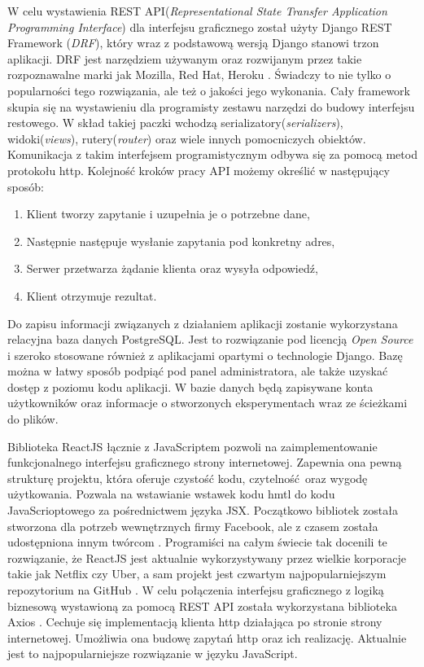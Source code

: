 W celu wystawienia REST API(\textit{Representational State Transfer Application Programming Interface}) dla interfejsu graficznego został użyty Django REST Framework (\textit{DRF}), który wraz z podstawową wersją Django stanowi trzon aplikacji. DRF jest narzędziem używanym oraz rozwijanym przez takie rozpoznawalne marki jak  Mozilla, Red Hat, Heroku \cite{misc_django_rest}. Świadczy to nie tylko o popularności tego rozwiązania, ale też o jakości jego wykonania. Cały framework skupia się na wystawieniu dla programisty zestawu narzędzi do budowy interfejsu restowego. W skład takiej paczki wchodzą serializatory(\textit{serializers}), widoki(\textit{views}), rutery(\textit{router}) oraz wiele innych pomocniczych obiektów. Komunikacja z takim interfejsem programistycznym odbywa się za pomocą metod protokołu http. Kolejność kroków pracy API możemy określić w następujący sposób:
\begin{enumerate}
	\item Klient tworzy zapytanie i uzupełnia je o potrzebne dane, 
	\item Następnie następuje wysłanie zapytania pod konkretny adres,
	\item Serwer przetwarza żądanie klienta oraz wysyła odpowiedź,
	\item Klient otrzymuje rezultat.
\end{enumerate}

Do zapisu informacji związanych z działaniem aplikacji zostanie wykorzystana relacyjna baza danych PostgreSQL. Jest to rozwiązanie pod licencją \textit{Open Source} i szeroko stosowane również z aplikacjami opartymi o technologie Django. Bazę można w łatwy sposób podpiąć pod panel administratora, ale także uzyskać dostęp z poziomu kodu aplikacji. W bazie danych będą zapisywane konta użytkowników oraz informacje o stworzonych eksperymentach wraz ze ścieżkami do plików. 

Biblioteka ReactJS łącznie z JavaScriptem pozwoli na zaimplementowanie funkcjonalnego interfejsu graficznego strony internetowej. Zapewnia ona pewną strukturę projektu, która oferuje czystość kodu, czytelność oraz wygodę użytkowania. Pozwala na wstawianie wstawek kodu hmtl do kodu JavaScrioptowego za pośrednictwem języka JSX. Początkowo bibliotek została stworzona dla potrzeb wewnętrznych firmy Facebook, ale z czasem została udostępniona innym twórcom \cite{misc_react}. Programiści na całym świecie tak docenili te rozwiązanie, że ReactJS jest aktualnie wykorzystywany przez wielkie korporacje takie jak Netflix czy Uber, a sam projekt jest czwartym najpopularniejszym repozytorium na GitHub \cite{misc_react_pop}. W celu połączenia interfejsu graficznego z logiką biznesową wystawioną za pomocą REST API została wykorzystana biblioteka Axios \cite{misc_axios}. Cechuje się implementacją klienta http działająca po stronie strony internetowej. Umożliwia ona budowę zapytań http oraz ich realizację. Aktualnie jest to najpopularniejsze rozwiązanie w języku JavaScript. 

